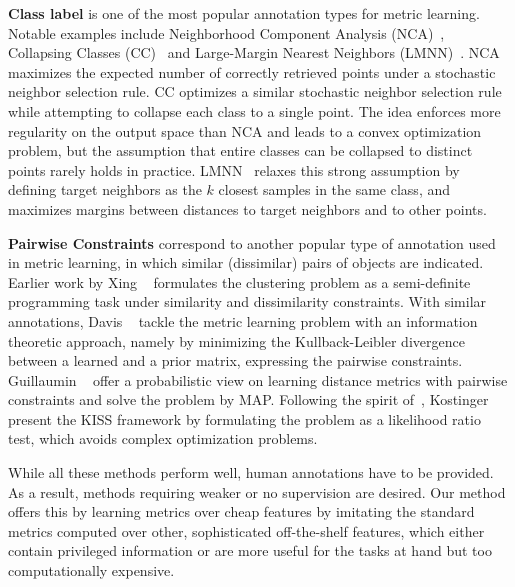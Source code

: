 \textbf{Class label} is one of the most popular annotation types for
metric learning. 
Notable examples include Neighborhood Component Analysis (NCA)~\citep{NCA:2004}, 
Collapsing Classes (CC)~\citep{class:clapse:nips05} and Large-Margin 
Nearest Neighbors (LMNN)~\citep{max:margin:knn}. NCA maximizes the expected 
number of correctly retrieved points under a stochastic neighbor selection
rule. CC optimizes a similar stochastic neighbor selection rule while
attempting to collapse each class to a single point. The idea enforces
more regularity on the output space than NCA and leads to a convex
optimization problem, but the assumption that entire classes can be
collapsed to distinct points rarely holds in practice.
LMNN~\citep{max:margin:knn} relaxes this strong assumption by defining
target neighbors as the $k$ closest samples in the same class, and
maximizes margins between distances to target neighbors and to other
points.

\textbf{Pairwise Constraints} correspond to another popular type of
annotation used in metric learning, in which similar (dissimilar)
pairs of objects are indicated. Earlier work by Xing
\etal~\citep{metric:nips03} formulates the clustering problem as a
semi-definite programming task under similarity and dissimilarity
constraints. With similar annotations, Davis
\etal~\citep{ml:information:07} tackle the metric learning problem with
an information theoretic approach, namely by minimizing the
Kullback-Leibler divergence between a learned and a prior matrix,
expressing the pairwise constraints. Guillaumin
\etal~\citep{ml:face:09} offer a probabilistic view on learning
distance metrics with pairwise constraints and solve the problem by
MAP. Following the spirit of~\citep{ml:information:07, ml:face:09},
Kostinger \etal \citep{large:scale:metric:cvpr12} present the KISS
framework by formulating the problem as a likelihood ratio test, which
avoids complex optimization problems.  

While all these methods perform well, human annotations have to be
provided. As a result, methods requiring weaker or no supervision are
desired. Our method offers this by learning metrics over
cheap features by imitating the standard metrics computed over other, sophisticated 
off-the-shelf features, which either contain privileged information or are more
useful for the tasks at hand but too computationally expensive.

